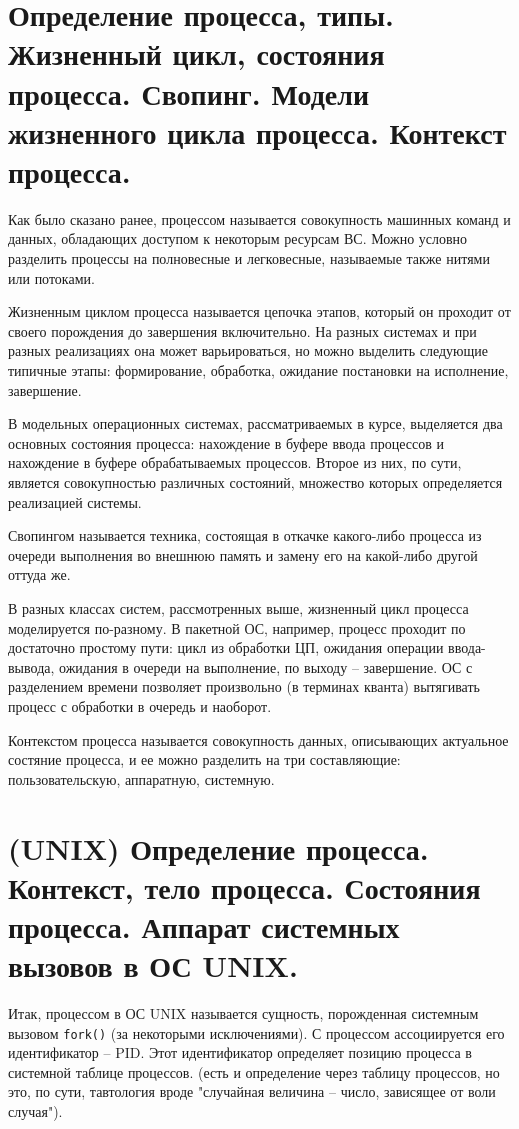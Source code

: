 \documentclass[a4paper,12pt,titlepage,finall]{article}
\begin{document}
\section{Определение процесса, типы. Жизненный цикл, состояния процесса.
Свопинг. Модели жизненного цикла процесса. Контекст процесса.}
Как было сказано ранее, процессом называется совокупность машинных команд и данных, обладающих доступом к некоторым ресурсам ВС. Можно условно разделить процессы на полновесные и легковесные, называемые также нитями или потоками.

Жизненным циклом процесса называется цепочка этапов, который он проходит от своего порождения до завершения включительно. На разных системах и при разных реализациях она может варьироваться, но можно выделить следующие типичные этапы: формирование, обработка, ожидание постановки на исполнение, завершение.

В модельных операционных системах, рассматриваемых в курсе, выделяется два основных состояния процесса: нахождение в буфере ввода процессов и нахождение в буфере обрабатываемых процессов. Второе из них, по сути, является совокупностью различных состояний, множество которых определяется реализацией системы.

Свопингом называется техника, состоящая в откачке какого-либо процесса из очереди выполнения во внешнюю память и замену его на какой-либо другой оттуда же.

В разных классах систем, рассмотренных выше, жизненный цикл процесса моделируется по-разному. В пакетной ОС, например, процесс проходит по достаточно простому пути: цикл из обработки ЦП, ожидания операции ввода-вывода, ожидания в очереди на выполнение, по выходу -- завершение. ОС с разделением времени позволяет произвольно (в терминах кванта) вытягивать процесс с обработки в очередь и наоборот.

Контекстом процесса называется совокупность данных, описывающих актуальное состяние процесса, и ее можно разделить на три составляющие: пользовательскую, аппаратную, системную.
\section{(UNIX) Определение процесса. Контекст, тело процесса. Состояния
процесса. Аппарат системных вызовов в ОС UNIX.}
Итак, процессом в ОС UNIX называется сущность, порожденная системным вызовом \texttt{fork()} (за некоторыми исключениями). С процессом ассоциируется его идентификатор -- PID. Этот идентификатор определяет позицию процесса в системной таблице процессов. (есть и определение через таблицу процессов, но это, по сути, тавтология вроде "случайная величина -- число, зависящее от воли случая").
\end{document}
